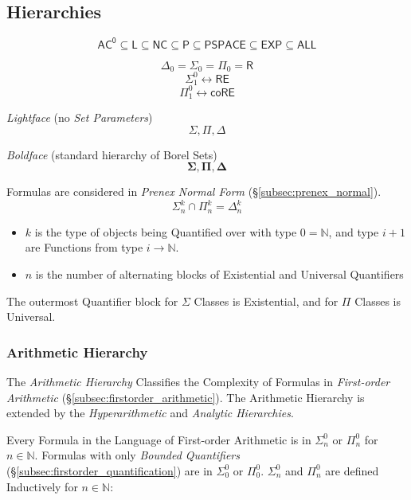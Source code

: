 \documentclass{article}
\begin{document}
\subsection{Hierarchies}\label{subsec:complexity_hierarchy}

\[
    \mathsf{AC^0} \subseteq \mathsf{L} \subseteq \mathsf{NC} \subseteq
    \mathsf{P} \subseteq \mathsf{PSPACE} \subseteq \mathsf{EXP}
    \subseteq \mathsf{ALL}
\]

\[
    \Delta_0 = \Sigma_0 = \Pi_0 = \mathsf{R}
\]\[
    \Sigma_1^0 \leftrightarrow \mathsf{RE}
\]\[
    \Pi_1^0 \leftrightarrow \mathsf{coRE}
\]


\emph{Lightface} (no \emph{Set Parameters}) %
\[
    \Sigma, \Pi, \Delta
\]

\emph{Boldface} (standard hierarchy of Borel Sets)
\[
    \mathbf{\Sigma}, \mathbf{\Pi}, \mathbf{\Delta}
\]

Formulas are considered in \emph{Prenex Normal Form}
(\S\ref{subsec:prenex_normal}).
\[
    \Sigma^k_n \cap \Pi^k_n = \Delta^k_n
\]
\begin{itemize}
    \item $k$ is the type of objects being Quantified over with type
      $0 = \mathbb{N}$, and type $i + 1$ are Functions from type $i
      \rightarrow \mathbb{N}$.
    \item $n$ is the number of alternating blocks of Existential and
      Universal Quantifiers
\end{itemize}
The outermost Quantifier block for $\Sigma$ Classes is Existential,
and for $\Pi$ Classes is Universal.



\subsubsection{Arithmetic Hierarchy}\label{subsec:arithmetic_hierarchy}

The \emph{Arithmetic Hierarchy} Classifies the Complexity of Formulas
in \emph{First-order Arithmetic}
(\S\ref{subsec:firstorder_arithmetic}). The Arithmetic Hierarchy is
extended by the \emph{Hyperarithmetic} and \emph{Analytic
  Hierarchies}.

Every Formula in the Language of First-order Arithmetic is in
$\Sigma^0_n$ or $\Pi^0_n$ for $n \in \mathbb{N}$. Formulas with only
\emph{Bounded Quantifiers} (\S\ref{subsec:firstorder_quantification})
are in $\Sigma^0_0$ or $\Pi^0_0$. $\Sigma^0_n$ and $\Pi^0_n$ are
defined Inductively for $n \in \mathbb{N}$:
\end{document}
